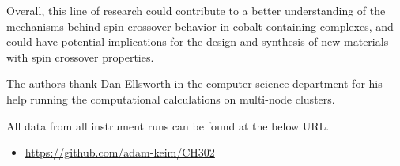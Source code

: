 \documentclass[journal=jacsat,manuscript=communication]{achemso}
\begin{document}
\break

Overall, this line of research could contribute to a better understanding of the mechanisms behind spin crossover behavior in cobalt-containing complexes, and could have potential implications for the design and synthesis of new materials with spin crossover properties.





\begin{acknowledgement}
The authors thank Dan Ellsworth in the computer science department for his help running the computational calculations on multi-node clusters.  

\end{acknowledgement}

\begin{suppinfo}

All data from all instrument runs can be found at the below URL.
\begin{itemize}
  \item \url{https://github.com/adam-keim/CH302}
\end{itemize}

\end{suppinfo}

% 
\end{document}
